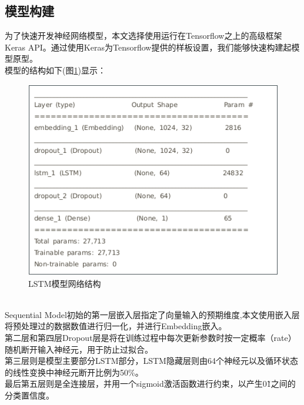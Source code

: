 \subsection{模型构建}
为了快速开发神经网络模型，本文选择使用运行在Tensorflow之上的高级框架Keras API。通过使用Keras为Tensorflow提供的样板设置，我们能够快速构建起模型原型。
\\\indent{}模型的结构如下(图\ref{fig:LSTM})显示：
\begin{figure}[!ht]
    \setlength{\abovecaptionskip}{0.cm}
    \setlength{\belowcaptionskip}{-0.cm}
    \centering
     \includegraphics[scale=0.65]{Figs/lstm.png}
    \caption{LSTM模型网络结构}
    \label{fig:LSTM}
\end{figure}
\\\indent{}Sequential Model初始的第一层嵌入层指定了向量输入的预期维度,本文使用嵌入层将预处理过的数据数值进行归一化，并进行Embedding嵌入。
\\\indent{}第二层和第四层Dropout层是将在训练过程中每次更新参数时按一定概率（rate）随机断开输入神经元，用于防止过拟合。
\\\indent{}第三层则是模型主要部分LSTM部分，LSTM隐藏层则由64个神经元以及循环状态的线性变换中神经元断开比例为50\%。
\\\indent{}最后第五层则是全连接层，并用一个sigmoid激活函数进行约束，以产生0\~1之间的分类置信度。
